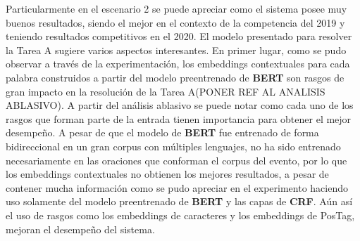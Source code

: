 Particularmente en el escenario 2 se puede apreciar como el sistema posee muy buenos resultados, siendo el mejor en el contexto de la competencia del 2019 y teniendo resultados competitivos en el 2020. El modelo presentado para resolver la Tarea A sugiere varios aspectos interesantes. En primer lugar, como se pudo observar a trav\'es de la experimentaci\'on, los embeddings contextuales para cada palabra construidos a partir del modelo preentrenado de \textbf{BERT} son rasgos de gran impacto en la resoluci\'on de la Tarea A(PONER REF AL ANALISIS ABLASIVO). A partir del an\'alisis ablasivo se puede notar como cada uno de los rasgos que forman parte de la entrada tienen importancia para obtener el mejor desempe\~no. A pesar de que el modelo de \textbf{BERT} fue entrenado de forma bidireccional en un gran corpus con m\'ultiples lenguajes, no ha sido entrenado necesariamente en las oraciones que conforman el corpus del evento, por lo que los embeddings contextuales no obtienen los mejores resultados, a pesar de contener mucha informaci\'on como se pudo apreciar en el experimento haciendo uso solamente del modelo preentrenado de \textbf{BERT} y las capas de \textbf{CRF}. A\'un as\'i el uso de rasgos como los embeddings de caracteres y los embeddings de PosTag, mejoran el desempe\~no del sistema. 

